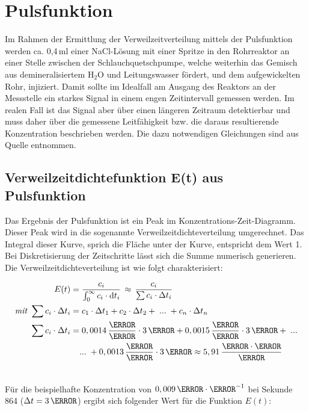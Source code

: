 \documentclass[12pt,liststotoc]{report}
\begin{document}
\section{Pulsfunktion}

Im Rahmen der Ermittlung der Verweilzeitverteilung mittels der Pulsfunktion werden ca. 0,4\,ml einer NaCl-Lösung mit einer Spritze in den Rohrreaktor an einer Stelle zwischen der Schlauchquetschpumpe, welche weiterhin das Gemisch aus demineralisiertem H$_2$O und Leitungswasser fördert, und dem aufgewickelten Rohr, injiziert. Damit sollte im Idealfall am Ausgang des Reaktors an der Messstelle ein starkes Signal in einem engen Zeitintervall gemessen werden. Im realen Fall ist das Signal aber über einen längeren Zeitraum detektierbar und muss daher über die gemessene Leitfähigkeit bzw. die daraus resultierende Konzentration beschrieben werden. Die dazu notwendigen Gleichungen sind aus Quelle \cite{Skript_2018,Chem_Reaktion_2018} entnommen.
 
\subsection{Verweilzeitdichtefunktion E(t) aus Pulsfunktion}

Das Ergebnis der Pulsfunktion ist ein Peak im Konzentrations-Zeit-Diagramm. Dieser Peak wird in die sogenannte Verweilzeitdichteverteilung umgerechnet. Das Integral dieser Kurve, sprich die Fläche unter der Kurve, entspricht dem Wert 1. Bei Diskretisierung der Zeitschritte lässt sich die Summe numerisch generieren. Die Verweilzeitdichteverteilung ist wie folgt charakterisiert:

\begin{align}
E(t) =&\;\frac{c_{i}}{\int_{0}^{\infty} c_{i}\cdot \text{d}t_i}\,\approx\,\frac{c_i}{\sum c_i \cdot \Delta t_i}\\
\textit{mit }\sum c_i \cdot \Delta t_i =&\; c_1\cdot\Delta t_1 + c_2\cdot\Delta t_2 +\;...\;+c_n \cdot \Delta t_n \\
\sum c_i \cdot \Delta t_i =&\; 0,0014\,\frac{\mole}{\litre} \cdot 3\,\s + 0,0015\,\frac{\mole}{\litre}\cdot 3\,\s +\;...\notag\\
&...\;+0,0013\,\frac{\mole}{\litre} \cdot 3\,\s \approx 5,91\,\frac{\mole\cdot\s}{\litre}\notag\\\notag
\end{align}

Für die beispielhafte Konzentration von $0,009\,\mole\cdot\litre^{-1}$ bei Sekunde 864 ($\Delta t = 3\,\s$) ergibt sich folgender Wert für die Funktion $E(t)$:
\end{document}
